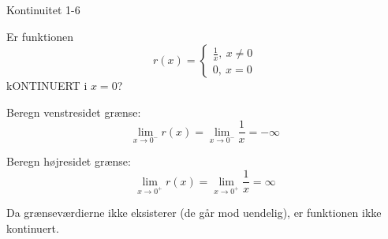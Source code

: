 \documentclass{article}
\begin{document}
\newpage

\begin{exercise}{Kontinuitet 1-6}

Er funktionen
\[
 r(x) = \begin{cases}
 \frac{1}{x}, \ x \neq 0 \\
 0, \ x = 0
 \end{cases}
\]
kONTINUERT i $x = 0$?


\hint

Beregn venstresidet grænse:
\[
\lim_{x \to 0^-} r(x) = \lim_{x \to 0^-} \frac{1}{x} = -\infty
\]

\hint

Beregn højresidet grænse:
\[
\lim_{x \to 0^+} r(x) = \lim_{x \to 0^+} \frac{1}{x} = \infty
\]

\hint

Da grænseværdierne ikke eksisterer (de går mod uendelig), er funktionen ikke kontinuert.

\end{exercise}
\end{document}
